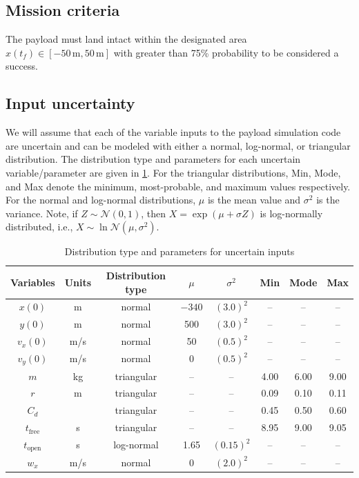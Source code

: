 \documentclass[11pt]{article}
\begin{document}
\subsection{Mission criteria}
The payload must land intact within the designated area $x(t_f)\in[-50\,\text{m}, 50\,\text{m}]$ with greater than 75\% probability to be considered a success.

\subsection{Input uncertainty}
We will assume that each of the variable inputs to the payload simulation code are uncertain and can be modeled with either a normal, log-normal, or triangular distribution. The distribution type and parameters for each uncertain variable/parameter are given in \cref{tbl:distributions}. For the triangular distributions, Min, Mode, and Max denote the minimum, most-probable, and maximum values respectively. For the normal and log-normal distributions, $\mu$ is the mean value and $\sigma^2$ is the variance. Note, if $Z\sim\mathcal{N}(0, 1)$, then $X=\exp(\mu+\sigma Z)$ is log-normally distributed, i.e., $X\sim\ln\mathcal{N}(\mu, \sigma^2)$.

\begin{table}[H]
  \begin{tabular}{cccccccc}\toprule
  Variables & Units & Distribution type & $\mu$ & $\sigma^2$ & Min & Mode & Max \\ \midrule
  $x(0)$ & m & normal & $-340$ & $(3.0)^2$ & -- & -- & -- \\
  $y(0)$ &m & normal & 500 & $(3.0)^2$ & -- & -- & -- \\
  $v_x(0)$ & m/s & normal & 50 & $(0.5)^2$ & -- & -- & -- \\
  $v_y(0)$ & m/s & normal & 0 & $(0.5)^2$ & -- & -- & -- \\\midrule
  $m$ &kg & triangular & -- & -- & 4.00 & 6.00 & 9.00 \\
  $r$ &m & triangular & -- & -- & 0.09 & 0.10 & 0.11 \\
  $C_d$ & &triangular & -- & -- & 0.45 & 0.50 & 0.60 \\
  $t_\text{free}$ & s & triangular & -- & -- & 8.95 & 9.00 & 9.05 \\
  $t_\text{open}$ & s & log-normal & 1.65 & $(0.15)^2$ & -- & -- & -- \\\midrule
  $w_x$ & m/s & normal & 0 & $(2.0)^2$ & -- & -- & -- \\\bottomrule
  \end{tabular}
  \caption{Distribution type and parameters for uncertain inputs}
  \label{tbl:distributions}
\end{table}
\end{document}
